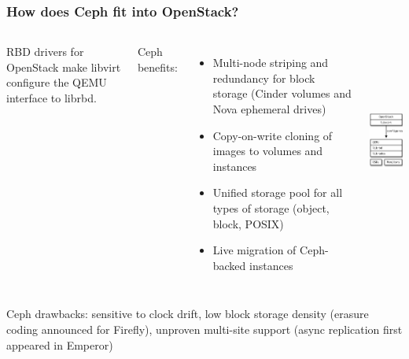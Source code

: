 \documentclass[hyperref=unicode,utf8,xcolor=pst]{beamer}
\begin{document}
\begin{frame}
	\frametitle{How does Ceph fit into OpenStack?}
	\begin{columns}
		RBD drivers for OpenStack make libvirt configure the
		QEMU interface to librbd.

		\vspace{2ex}
		Ceph benefits:
		\begin{itemize}
			\item Multi-node striping and redundancy for
				block storage (Cinder volumes and Nova
				ephemeral drives)
			\item Copy-on-write cloning of images to
				volumes and instances
			\item Unified storage pool for all types of
				storage (object, block, POSIX)
			\item Live migration of Ceph-backed instances
		\end{itemize}

		\includegraphics[height=6.5cm]{ceph-rbd-openstack}
	\end{columns}

	\vspace{2ex}
	Ceph drawbacks: sensitive to clock drift, low block storage
	density (erasure coding announced for Firefly), unproven
	multi-site support (async replication first appeared in Emperor)
\end{frame}
\end{document}
